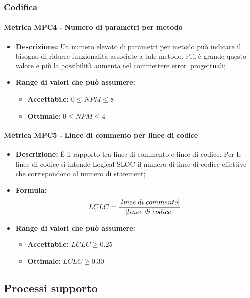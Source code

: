 \subsubsection{Codifica}  
    \paragraph{Metrica MPC4 - Numero di parametri per metodo} 
    \begin{itemize}
        \item \textbf{Descrizione:} Un numero elevato di parametri per metodo può indicare il bisogno di ridurre funzionalità associate a tale metodo. Più è grande questo valore e più la possibilità aumenta nel commettere errori progettuali;
        \item \textbf{Range di valori che può assumere:}
        \begin{itemize}
            \item \textbf{Accettabile:} $0 \leq{} NPM \leq 8$
            \item \textbf{Ottimale:} $0 \leq{} NPM \leq 4$
        \end{itemize}
    \end{itemize}

    \paragraph{Metrica MPC5 - Linee di commento per linee di codice}
    \begin{itemize}
        \item \textbf{Descrizione:} È il rapporto tra linee di commento e linee di codice. Per le linee di codice si intende Logical SLOC il numero di linee di codice effettive che corrispondono al numero di statement;
        \item \textbf{Formula:}$$LCLC = {|linee \; di \; commento| \over |linee \; di \; codice|}$$
        \item \textbf{Range di valori che può assumere:}
        \begin{itemize}
            \item \textbf{Accettabile:} $LCLC \geq 0.25$
            \item \textbf{Ottimale:} $LCLC \geq 0.30$
        \end{itemize}
    \end{itemize}

\subsection{Processi supporto}

